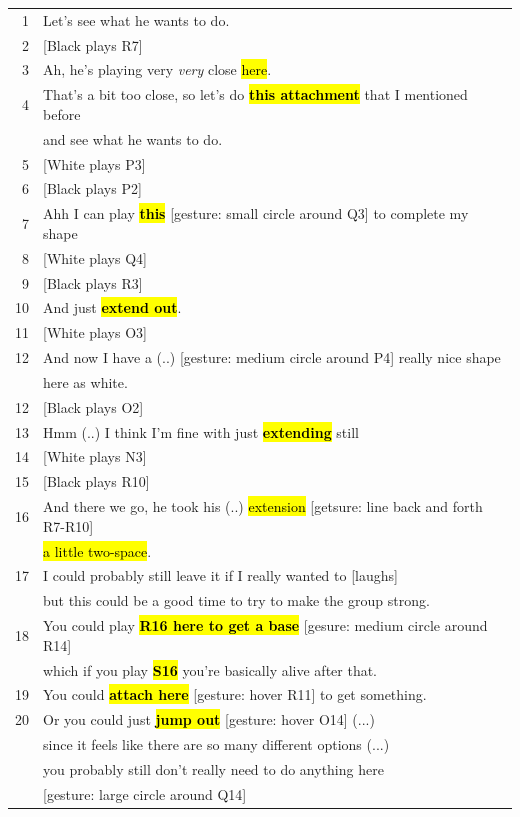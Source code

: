\documentclass{scrartcl}
\DeclareRobustCommand{\hlcyan}[1]{\sethlcolor{cyan}\hl{#1}}
\DeclareRobustCommand{\hlcyan}[1]{#1}
\begin{document}
\begin{longtable}{rl}
 1 & Let’s see what he wants to do.\\
 2 &[Black plays R7]\\
 3 &Ah, he’s playing very \emph{very} close \hlcyan{here}.\\
 4 &That’s a bit too close, so let’s do \hl{\textbf{this attachment}} that I mentioned before \\
     & and see what he wants to do.\\
 5 &[White plays P3]\\
 6 &[Black plays P2]\\
 7 & Ahh I can play \hl{\textbf{this}} [gesture: small circle around Q3] to complete my shape \\
 8 &[White plays Q4]\\
 9 &[Black plays R3]\\
10 & And just \hl{\textbf{extend out}}. \\
11 &[White plays O3]\\
12 &And now I have a (..) [gesture: medium circle around P4] really nice shape \\
     & here as white.\\
12 &[Black plays O2]\\
13 &Hmm (..) I think I’m fine with just \hl{\textbf{extending}} still\\
14 &[White plays N3]\\
15 &[Black plays R10]\\
16 &And there we go, he took his (..) \hlcyan{extension} [getsure: line back and forth R7-R10] \\
   & \hlcyan{a little two-space}.\\
17 & I could probably still leave it if I really wanted to [laughs]\\
     & but this could be a good time to try to make the group strong.\\
18 & You could play \hl{\textbf{R16 here to get a base}} [gesure: medium circle around R14]\\
   & which if you play \hl{\textbf{S16}} you’re basically alive after that. \\
19 & You could \hl{\textbf{attach here}} [gesture: hover R11] to get something.\\
20 & Or you could just \hl{\textbf{jump out}} [gesture: hover O14] (...)\\
     & since it feels like there are so many different options (...)\\
     & you probably still don't really need to do anything here \\
     & [gesture: large circle around Q14]\\
\end{longtable}
\end{document}
